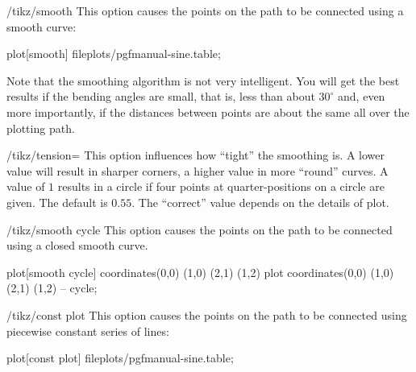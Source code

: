 \begin{key}{/tikz/smooth}
    This option causes the points on the path to be connected using a smooth
    curve:
\begin{codeexample}[]
\tikz\draw plot[smooth] file{plots/pgfmanual-sine.table};
\end{codeexample}

    Note that the smoothing algorithm is not very intelligent. You will get the
    best results if the bending angles are small, that is, less than about
    $30^\circ$ and, even more importantly, if the distances between points are
    about the same all over the plotting path.
\end{key}

\begin{key}{/tikz/tension=}
    This option influences how ``tight'' the smoothing is. A lower value will
    result in sharper corners, a higher value in more ``round'' curves. A value
    of $1$ results in a circle if four points at quarter-positions on a circle
    are given. The default is $0.55$. The ``correct'' value depends on the
    details of plot.
\begin{codeexample}[]
\end{codeexample}
\end{key}

\begin{key}{/tikz/smooth cycle}
    This option causes the points on the path to be connected using a closed
    smooth curve.
\begin{codeexample}[]
\tikz[scale=0.5]
  \draw plot[smooth cycle] coordinates{(0,0) (1,0) (2,1) (1,2)}
        plot               coordinates{(0,0) (1,0) (2,1) (1,2)} -- cycle;
\end{codeexample}
\end{key}

\begin{key}{/tikz/const plot}
    This option causes the points on the path to be connected using piecewise
    constant series of lines:
\begin{codeexample}[]
\tikz\draw plot[const plot] file{plots/pgfmanual-sine.table};
\end{codeexample}
\end{key}


